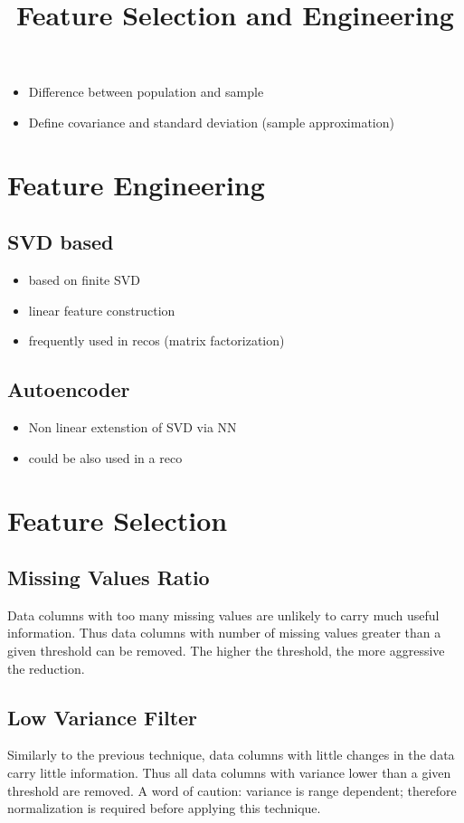 \documentclass[10pt,a4paper]{article}
\title{Feature Selection and Engineering}
\begin{document}
\maketitle

\begin{itemize}
\item Difference between population and sample
\item Define covariance and standard deviation (sample approximation)
\end{itemize}

\section{Feature Engineering}
\subsection*{SVD based}
\begin{itemize}
\item based on finite SVD
\item linear feature construction
\item frequently used in recos (matrix factorization) 
\end{itemize}

\subsection*{Autoencoder}
\begin{itemize}
\item Non linear extenstion of SVD via NN
\item could be also used in a reco
\end{itemize}

\section{Feature Selection}

\subsection*{Missing Values Ratio}
Data columns with too many missing values are unlikely to carry much useful information. Thus data columns with number of missing values greater than a given threshold can be removed. The higher the threshold, the more aggressive the reduction.
\subsection*{Low Variance Filter}
Similarly to the previous technique, data columns with little changes in the data carry little information. Thus all data columns with variance lower than a given threshold are removed. A word of caution: variance is range dependent; therefore normalization is required before applying this technique.
\end{document}
